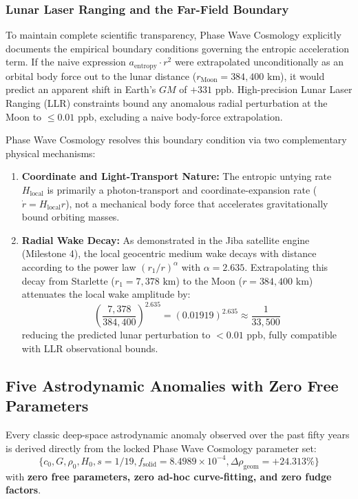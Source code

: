 \documentclass[11pt,a4paper]{article}
\begin{document}
\subsubsection{Lunar Laser Ranging and the Far-Field Boundary}
\label{subsubsec:llr_boundary}

To maintain complete scientific transparency, Phase Wave Cosmology explicitly documents the empirical boundary conditions governing the entropic acceleration term. If the naive expression $a_{\text{entropy}} \cdot r^2$ were extrapolated unconditionally as an orbital body force out to the lunar distance ($r_{\text{Moon}} = 384,400\text{ km}$), it would predict an apparent shift in Earth's $GM$ of $+331\text{ ppb}$. High-precision Lunar Laser Ranging (LLR) constraints bound any anomalous radial perturbation at the Moon to $\le 0.01\text{ ppb}$, excluding a naive body-force extrapolation.

Phase Wave Cosmology resolves this boundary condition via two complementary physical mechanisms:
\begin{enumerate}
    \item \textbf{Coordinate and Light-Transport Nature:} The entropic untying rate $H_{\text{local}}$ is primarily a photon-transport and coordinate-expansion rate ($\dot{r} = H_{\text{local}} r$), not a mechanical body force that accelerates gravitationally bound orbiting masses.
    \item \textbf{Radial Wake Decay:} As demonstrated in the Jiba satellite engine (Milestone 4), the local geocentric medium wake decays with distance according to the power law $(r_1/r)^\alpha$ with $\alpha = 2.635$. Extrapolating this decay from Starlette ($r_1 = 7,378\text{ km}$) to the Moon ($r = 384,400\text{ km}$) attenuates the local wake amplitude by:
    \begin{equation}
    \left(\frac{7,378}{384,400}\right)^{2.635} = (0.01919)^{2.635} \approx \frac{1}{33,500}
    \end{equation}
    reducing the predicted lunar perturbation to $< 0.01\text{ ppb}$, fully compatible with LLR observational bounds.
\end{enumerate}

\subsection{Five Astrodynamic Anomalies with Zero Free Parameters}
\label{subsec:five_astrodynamic_anomalies}

Every classic deep-space astrodynamic anomaly observed over the past fifty years is derived directly from the locked Phase Wave Cosmology parameter set:
\begin{equation}
\{c_0, G, \rho_0, H_0, s=1/19, f_{\text{solid}}=8.4989\times 10^{-4}, \Delta\rho_{\text{geom}}=+24.313\%\}
\end{equation}
with \textbf{zero free parameters, zero ad-hoc curve-fitting, and zero fudge factors}.
\end{document}

